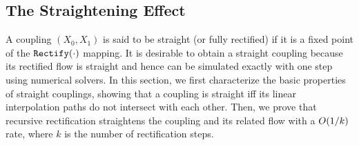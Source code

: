 \subsection{The Straightening Effect}
\label{sec:straight}


A coupling $(X_0,X_1)$ 
is said to be straight 
(or fully rectified)  if 
it is a fixed point of the $\mathtt{Rectify}(\cdot)$ mapping.
It is desirable to obtain a straight coupling because its rectified flow is straight and 
hence can be simulated exactly with one step using numerical solvers. 
In this section, 
we first characterize the basic properties of straight couplings, showing that a coupling is straight iff its linear interpolation paths do not intersect with each other. Then, we prove that recursive rectification 
straightens the coupling and its related flow 
with a ${O}{\left(1/k\right)}$ rate, where $k$ is the number of rectification steps. %


